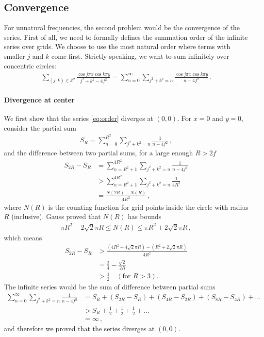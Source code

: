 \documentclass[]{article}
\begin{document}
\subsection{Convergence}

For unnatural frequencies, the second problem would be the convergence of the series. First of all, we need to formally defines the summation order of the infinite series over grids. We choose to use the most natural order where terms with smaller $j$ and $k$ come first. Strictly speaking, we want to sum infinitely over concentric circles:
\begin{align}
\sum_{(j,k)\in\mathbb{Z}^2}\frac{\cos j\pi x \cos k\pi y}{j^2 + k^2 - 4f^2} = \sum_{n=0}^{\infty}\sum_{j^2+k^2=n} \frac{\cos j\pi x \cos k\pi y}{n - 4f^2}\label{eq:order}\,.
\end{align}

\paragraph{Divergence at center} We first show that the series \eqref{eq:order} diverges at $(0, 0)$. For $x = 0$ and $y = 0$, consider the partial sum
\begin{align}
S_R = \sum_{n = 0}^{R^2}\sum_{j^2+k^2=n}\frac{1}{n - 4f^2}\,,
\end{align}
and the difference between two partial sums, for a large enough $R > 2f$
\begin{align*}
S_{2R} - S_{R} &= \sum_{n = R^2 + 1}^{4R^2}\sum_{j^2+k^2=n}\frac{1}{n - 4f^2} \\
&>\sum_{n = R^2 + 1}^{4R^2}\sum_{j^2+k^2=n}\frac{1}{4R^2} \\
&=\frac{N(2R) - N(R)}{4R^2}\,,
\end{align*}
where $N(R)$ is the counting function for grid points inside the circle with radius $R$ (inclusive). Gauss proved\cite{cite:gauss} that $N(R)$ has bounds
\begin{align}
 \pi R^2 - 2\sqrt{2}\pi R\le N(R) \le \pi R^2 + 2\sqrt{2}\pi R\,,
\end{align}
which means
\begin{align*}
S_{2R} - S_{R} &> \frac{(4R^2 - 4\sqrt{2}\pi R) - (R^2 + 2\sqrt{2}\pi R)}{4R^2}\\
&=\frac{3}{4} - \frac{\sqrt{2}}{2R}\\
&>\frac{1}{2}\quad (\mbox{for }R > 3).
\end{align*}
The infinite series would be the sum of difference between partial sums
\begin{align*}
 \sum_{n=0}^{\infty}\sum_{j^2+k^2=n} \frac{1}{n - 4f^2} &= S_R + (S_{2R} - S_{R}) + (S_{4R} - S_{2R}) + (S_{8R} - S_{4R}) + \dots\\
 &>S_R + \frac{1}{2}+ \frac{1}{2}+ \frac{1}{2}+\dots\\
 &=\infty\,,
\end{align*}
and therefore we proved that the series diverges at $(0, 0)$.
\end{document}
